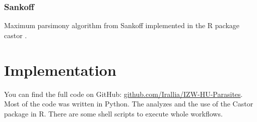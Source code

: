       \subsubsection{Sankoff}
        Maximum parsimony algorithm from Sankoff implemented in the R package castor \cite{Louca2017}. \\


  \section{Implementation}
    You can find the full code on GitHub: 
      \hyperlink{github.com/Irallia/IZW-HU-Parasites}{github.com/Irallia/IZW-HU-Parasites}. \\
    Most of the code was written in Python. The analyzes and the use of the Castor package in R. There 
      are some shell scripts to execute whole workflows.


